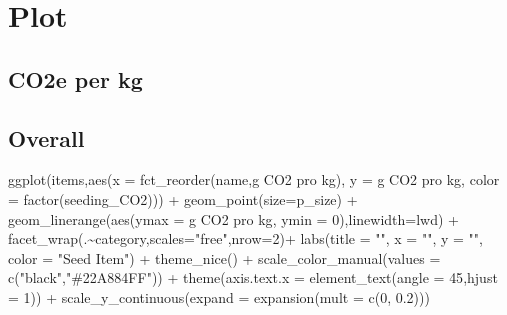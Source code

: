 \documentclass[
  letterpaper,
  DIV=11,
  numbers=noendperiod]{scrartcl}
\newenvironment{Shaded}{\begin{snugshade}}{\end{snugshade}}
\newcommand{\AttributeTok}[1]{\textcolor[rgb]{0.40,0.45,0.13}{#1}}
\newcommand{\DecValTok}[1]{\textcolor[rgb]{0.68,0.00,0.00}{#1}}
\newcommand{\FloatTok}[1]{\textcolor[rgb]{0.68,0.00,0.00}{#1}}
\newcommand{\FunctionTok}[1]{\textcolor[rgb]{0.28,0.35,0.67}{#1}}
\newcommand{\NormalTok}[1]{\textcolor[rgb]{0.00,0.23,0.31}{#1}}
\newcommand{\SpecialCharTok}[1]{\textcolor[rgb]{0.37,0.37,0.37}{#1}}
\newcommand{\StringTok}[1]{\textcolor[rgb]{0.13,0.47,0.30}{#1}}
\begin{document}
\section{Plot}\label{plot}

\subsection{CO2e per kg}\label{co2e-per-kg}

\subsection{Overall}

\begin{Shaded}
\begin{Highlighting}[]
\FunctionTok{ggplot}\NormalTok{(items,}\FunctionTok{aes}\NormalTok{(}\AttributeTok{x =} \FunctionTok{fct\_reorder}\NormalTok{(name,}\StringTok{\textasciigrave{}}\AttributeTok{g CO2 pro kg}\StringTok{\textasciigrave{}}\NormalTok{),}
                 \AttributeTok{y =} \StringTok{\textasciigrave{}}\AttributeTok{g CO2 pro kg}\StringTok{\textasciigrave{}}\NormalTok{,}
                 \AttributeTok{color =} \FunctionTok{factor}\NormalTok{(seeding\_CO2))) }\SpecialCharTok{+}
  \FunctionTok{geom\_point}\NormalTok{(}\AttributeTok{size=}\NormalTok{p\_size) }\SpecialCharTok{+}
  \FunctionTok{geom\_linerange}\NormalTok{(}\FunctionTok{aes}\NormalTok{(}\AttributeTok{ymax =} \StringTok{\textasciigrave{}}\AttributeTok{g CO2 pro kg}\StringTok{\textasciigrave{}}\NormalTok{, }\AttributeTok{ymin =} \DecValTok{0}\NormalTok{),}\AttributeTok{linewidth=}\NormalTok{lwd) }\SpecialCharTok{+}
  \FunctionTok{facet\_wrap}\NormalTok{(.}\SpecialCharTok{\textasciitilde{}}\NormalTok{category,}\AttributeTok{scales=}\StringTok{"free"}\NormalTok{,}\AttributeTok{nrow=}\DecValTok{2}\NormalTok{)}\SpecialCharTok{+}
  \FunctionTok{labs}\NormalTok{(}\AttributeTok{title =} \StringTok{""}\NormalTok{,}
       \AttributeTok{x     =} \StringTok{""}\NormalTok{,}
       \AttributeTok{y     =} \StringTok{""}\NormalTok{,}
       \AttributeTok{color =} \StringTok{"Seed Item"}\NormalTok{) }\SpecialCharTok{+}
  \FunctionTok{theme\_nice}\NormalTok{() }\SpecialCharTok{+}
  \FunctionTok{scale\_color\_manual}\NormalTok{(}\AttributeTok{values =} \FunctionTok{c}\NormalTok{(}\StringTok{"black"}\NormalTok{,}\StringTok{"\#22A884FF"}\NormalTok{)) }\SpecialCharTok{+}
  \FunctionTok{theme}\NormalTok{(}\AttributeTok{axis.text.x =} \FunctionTok{element\_text}\NormalTok{(}\AttributeTok{angle =} \DecValTok{45}\NormalTok{,}\AttributeTok{hjust =} \DecValTok{1}\NormalTok{)) }\SpecialCharTok{+}
  \FunctionTok{scale\_y\_continuous}\NormalTok{(}\AttributeTok{expand =} \FunctionTok{expansion}\NormalTok{(}\AttributeTok{mult =} \FunctionTok{c}\NormalTok{(}\DecValTok{0}\NormalTok{, }\FloatTok{0.2}\NormalTok{))) }
\end{Highlighting}
\end{Shaded}
\end{document}
